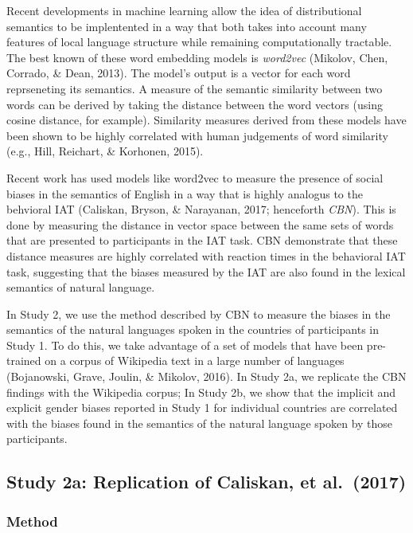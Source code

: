 \documentclass[10pt, letterpaper]{article}
\begin{document}
Recent developments in machine learning allow the idea of distributional
semantics to be implentented in a way that both takes into account many
features of local language structure while remaining computationally
tractable. The best known of these word embedding models is
\emph{word2vec} (Mikolov, Chen, Corrado, \& Dean, 2013). The model's
output is a vector for each word reprseneting its semantics. A measure
of the semantic similarity between two words can be derived by taking
the distance between the word vectors (using cosine distance, for
example). Similarity measures derived from these models have been shown
to be highly correlated with human judgements of word similarity (e.g.,
Hill, Reichart, \& Korhonen, 2015).

Recent work has used models like word2vec to measure the presence of
social biases in the semantics of English in a way that is highly
analogus to the behvioral IAT (Caliskan, Bryson, \& Narayanan, 2017;
henceforth \emph{CBN}). This is done by measuring the distance in vector
space between the same sets of words that are presented to participants
in the IAT task. CBN demonstrate that these distance measures are highly
correlated with reaction times in the behavioral IAT task, suggesting
that the biases measured by the IAT are also found in the lexical
semantics of natural language.

In Study 2, we use the method described by CBN to measure the biases in
the semantics of the natural languages spoken in the countries of
participants in Study 1. To do this, we take advantage of a set of
models that have been pre-trained on a corpus of Wikipedia text in a
large number of languages (Bojanowski, Grave, Joulin, \& Mikolov, 2016).
In Study 2a, we replicate the CBN findings with the Wikipedia corpus; In
Study 2b, we show that the implicit and explicit gender biases reported
in Study 1 for individual countries are correlated with the biases found
in the semantics of the natural language spoken by those participants.

\subsection{Study 2a: Replication of Caliskan, et
al.~(2017)}\label{study-2a-replication-of-caliskan-et-al.2017}

\subsubsection{Method}\label{method-1}
\end{document}
